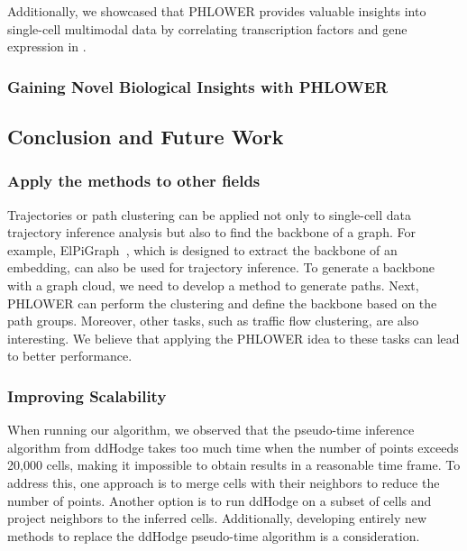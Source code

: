 Additionally, we showcased that PHLOWER provides valuable insights into single-cell multimodal data by correlating transcription factors and gene expression in .


\subsubsection{Gaining Novel Biological Insights with PHLOWER}

\subsection{Conclusion and Future Work}

\subsubsection{Apply the methods to other fields}
Trajectories or path clustering can be applied not only to single-cell data trajectory inference analysis but also to find the backbone of a graph. For example, ElPiGraph~\citep{albergante2020ElPiGraph}, which is designed to extract the backbone of an embedding, can also be used for trajectory inference. To generate a backbone with a graph cloud, we need to develop a method to generate paths. Next, PHLOWER can perform the clustering and define the backbone based on the path groups. Moreover, other tasks, such as traffic flow clustering\citep{kim2015spatial}, are also interesting. We believe that applying the PHLOWER idea to these tasks can lead to better performance.



\subsubsection{Improving Scalability}
When running our algorithm, we observed that the pseudo-time inference algorithm from ddHodge takes too much time when the number of points exceeds 20,000 cells, making it impossible to obtain results in a reasonable time frame. To address this, one approach is to merge cells with their neighbors to reduce the number of points. Another option is to run ddHodge on a subset of cells and project neighbors to the inferred cells. Additionally, developing entirely new methods to replace the ddHodge pseudo-time algorithm is a consideration.


